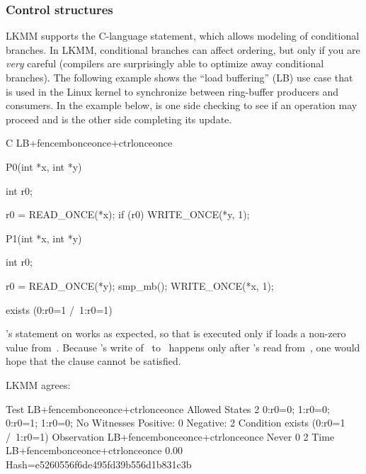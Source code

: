 \subsubsection{Control structures}

LKMM supports the C-language  statement, which allows modeling of
conditional branches.
In LKMM, conditional branches can affect ordering, but only if you are
\emph{very} careful (compilers are surprisingly able to optimize away
conditional branches).
The following example shows the ``load buffering'' (LB) use case that is
used in the Linux kernel to synchronize between ring-buffer producers and
consumers.
In the example below,  is one side checking to see if an operation
may proceed and  is the other side completing its update.

\begin{fcvlabel}
\begin{VerbatimN}[commandchars=\%\@\$]
	C LB+fencembonceonce+ctrlonceonce

	{}

	P0(int *x, int *y)
	{
		int r0;

		r0 = READ_ONCE(*x);         %
		if (r0)                     %
			WRITE_ONCE(*y, 1);  %
	}

	P1(int *x, int *y)
	{
		int r0;

		r0 = READ_ONCE(*y);
		smp_mb();
		WRITE_ONCE(*x, 1);
	}

	exists (0:r0=1 /\ 1:r0=1)      %
\end{VerbatimN}
\end{fcvlabel}

\begin{fcvref}
's  statement on  works as expected, so that
 is executed only if  loads a non-zero value
from~.
Because 's write of~ to~ happens only after
's read from~, one would hope that the  clause
cannot be satisfied.
\end{fcvref}
LKMM agrees:

\begin{VerbatimN}
	Test LB+fencembonceonce+ctrlonceonce Allowed
	States 2
	0:r0=0; 1:r0=0;
	0:r0=1; 1:r0=0;
	No
	Witnesses
	Positive: 0 Negative: 2
	Condition exists (0:r0=1 /\ 1:r0=1)
	Observation LB+fencembonceonce+ctrlonceonce Never 0 2
	Time LB+fencembonceonce+ctrlonceonce 0.00
	Hash=e5260556f6de495fd39b556d1b831c3b
\end{VerbatimN}

